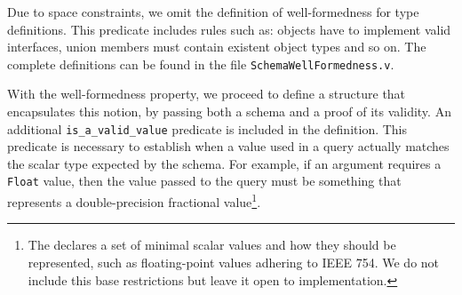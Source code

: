 Due to space constraints, we omit the definition of well-formedness for type definitions. This predicate includes rules such as: objects have to implement valid interfaces, union members must contain existent object types and so on. The complete definitions can be found in the file \texttt{SchemaWellFormedness.v}. 




With the well-formedness property, we proceed to define a structure that encapsulates this notion, by passing both a schema and a proof of its validity. An additional \texttt{is_a_valid_value} predicate is included in the definition. 
This predicate is necessary to establish when a value used in a query actually matches the scalar type expected by the schema. For example, if an argument requires a \texttt{Float} value, then the value passed to the query must be something that represents a double-precision fractional value\footnote{The \spec{} declares a set of minimal scalar values and how they should be represented, such as floating-point values adhering to IEEE 754. We do not include this base restrictions but leave it open to implementation.}. 

